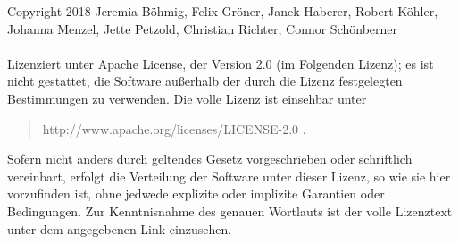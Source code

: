 Copyright 2018 Jeremia B\"{o}hmig, Felix Gr\"{o}ner, Janek Haberer, Robert K\"{o}hler, Johanna Menzel, Jette Petzold, Christian Richter, Connor Sch\"{o}nberner \\
\\Lizenziert unter Apache License, der Version 2.0 (im Folgenden Lizenz); es ist nicht gestattet, die Software au\ss{}erhalb der durch die Lizenz festgelegten Bestimmungen zu verwenden.
Die volle Lizenz ist einsehbar unter
\begin{quote}
	http://www.apache.org/licenses/LICENSE-2.0 .
\end{quote}
Sofern nicht anders durch geltendes Gesetz vorgeschrieben oder schriftlich vereinbart, erfolgt die Verteilung der Software unter dieser Lizenz, so wie sie hier vorzufinden ist, ohne jedwede explizite oder implizite Garantien oder Bedingungen.
Zur Kenntnisnahme des genauen Wortlauts ist der volle Lizenztext unter dem angegebenen Link einzusehen.

